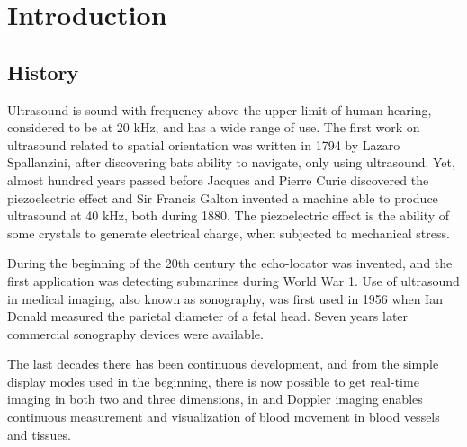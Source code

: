 \section{Introduction}
\subsection{History}
Ultrasound is sound with frequency above the upper limit of human hearing, considered to be at 20 kHz, and has a wide range of use. The first work on ultrasound related to spatial orientation was written in 1794 by Lazaro Spallanzini, after discovering bats ability to navigate, only using ultrasound. Yet, almost hundred years passed before Jacques and Pierre Curie discovered the piezoelectric effect and Sir Francis Galton invented a machine able to produce ultrasound at 40 kHz, both during 1880. The piezoelectric effect is the ability of some crystals to generate electrical charge, when subjected to mechanical stress.

During the beginning of the 20th century the echo-locator was invented, and the first application was detecting submarines during World War 1. Use of ultrasound in medical imaging, also known as sonography, was first used in 1956 when Ian Donald measured the parietal diameter of a fetal head. Seven years later commercial sonography devices were available.

The last decades there has been continuous development, and from the simple display modes used in the beginning, there is now possible to get real-time imaging in both two and three dimensions, in and Doppler imaging enables continuous measurement and visualization of blood movement in blood vessels and tissues.

\subsection{} 
   